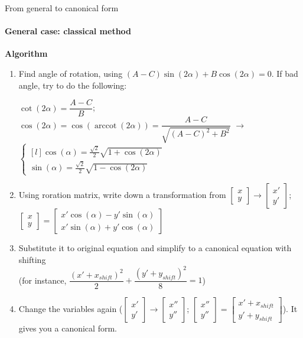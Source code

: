 \documentclass[aspectratio=169]{beamer}
\begin{document}
\begin{frame}[t]{From general to canonical form}
\framesubtitle{General case: classical method}
\scriptsize
\vspace{-0.2cm}
        \textbf{Algorithm}
        \begin{enumerate}
            \item Find angle of rotation, using $(A-C)\sin(2\alpha) + B\cos(2\alpha)=0$. If bad angle, try to do the following: \medskip

             $\cot(2\alpha)=\dfrac{A-C}{B}$; $\cos(2\alpha)=\cos(\operatorname{arccot}(2\alpha))=\dfrac{A-C}{\sqrt{(A-C)^2+B^2}}$ $\rightarrow$ $\left\{\begin{matrix*}[l] \cos(\alpha)=\frac{\sqrt{2}}{2}\sqrt{1+\cos(2\alpha)}
            \\ \sin(\alpha)=\frac{\sqrt{2}}{2}\sqrt{1-\cos(2\alpha)}
            \end{matrix*}\right.$
            \item Using roration matrix, write down a transformation from $\begin{bmatrix}x\\y\end{bmatrix} \rightarrow \begin{bmatrix}x'\\y'\end{bmatrix}$; $\begin{bmatrix}x\\y\end{bmatrix} = \begin{bmatrix}
            x'\cos(\alpha) - y'\sin(\alpha)\\ 
            x'\sin(\alpha) + y'\cos(\alpha) 
            \end{bmatrix}$
            \item Substitute it to original equation and simplify to a canonical equation with shifting \\ (for instance, $\dfrac{(x'+x_{shift})^2}{2}+\dfrac{(y'+y_{shift})^2}{8}=1$)
            \item Change the variables again ($\begin{bmatrix}x'\\y'\end{bmatrix} \rightarrow \begin{bmatrix}x''\\y''\end{bmatrix}$; $\begin{bmatrix}x''\\y''\end{bmatrix} = \begin{bmatrix}x' + x_{shift}\\y'+y_{shift}\end{bmatrix}$). It gives you a canonical form.

\end{enumerate}
\end{frame}
\end{document}
